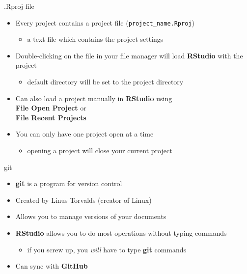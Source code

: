 \documentclass[
  ignorenonframetext,
  aspectratio=169]{beamer}
\providecommand{\tightlist}{%
  \setlength{\itemsep}{0pt}\setlength{\parskip}{0pt}}
\begin{document}
\begin{frame}[fragile]{.Rproj file}
\protect\hypertarget{rproj-file}{}
\begin{itemize}
\tightlist
\item
  Every project contains a project file (\texttt{project\_name.Rproj})

  \begin{itemize}
  \tightlist
  \item
    a text file which contains the project settings
  \end{itemize}
\item
  Double-clicking on the file in your file manager will load
  \textbf{RStudio} with the project

  \begin{itemize}
  \tightlist
  \item
    default directory will be set to the project directory
  \end{itemize}
\item
  Can also load a project manually in \textbf{RStudio} using\\
  \textbf{File \textbar{} Open Project} or\\
  \textbf{File \textbar{} Recent Projects}
\item
  You can only have one project open at a time

  \begin{itemize}
  \tightlist
  \item
    opening a project will close your current project
  \end{itemize}
\end{itemize}
\end{frame}

\begin{frame}{git}
\protect\hypertarget{git}{}
\begin{itemize}
\tightlist
\item
  \textbf{git} is a program for version control
\item
  Created by Linus Torvalds (creator of Linux)
\item
  Allows you to manage versions of your documents
\item
  \textbf{RStudio} allows you to do most operations without typing
  commands

  \begin{itemize}
  \tightlist
  \item
    if you screw up, you \emph{will} have to type \textbf{git} commands
  \end{itemize}
\item
  Can sync with \textbf{GitHub}
\end{itemize}
\end{frame}
\end{document}
